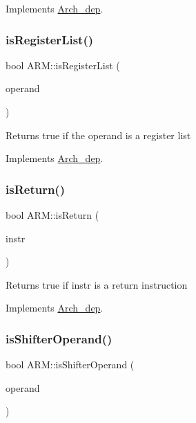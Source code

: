 Implements \hyperlink{classArch__dep_aa96008928838f1ff0f96ba83b07b90e2}{Arch\+\_\+dep}.

\mbox{\label{classARM_a62f252e1f0782243bc908a080ca1b427}} 
\subsubsection{\texorpdfstring{is\+Register\+List()}{isRegisterList()}}
{\footnotesize\ttfamily bool A\+R\+M\+::is\+Register\+List (\begin{DoxyParamCaption}\item[{const string \&}]{operand }\end{DoxyParamCaption})\hspace{0.3cm}{\ttfamily [virtual]}}

Returns true if the operand is a register list 

Implements \hyperlink{classArch__dep_a6c37096e67b2c02e9c0bd38313245979}{Arch\+\_\+dep}.

\mbox{\label{classARM_a341bfe78c32b16cd589cc9b4775e38fe}} 
\subsubsection{\texorpdfstring{is\+Return()}{isReturn()}}
{\footnotesize\ttfamily bool A\+R\+M\+::is\+Return (\begin{DoxyParamCaption}\item[{const \hyperlink{classObjdumpInstruction}{Objdump\+Instruction} \&}]{instr }\end{DoxyParamCaption})\hspace{0.3cm}{\ttfamily [virtual]}}

Returns true if instr is a return instruction 

Implements \hyperlink{classArch__dep_a0f8a68b8dc2188a0578f3b4d92a289ca}{Arch\+\_\+dep}.

\mbox{\label{classARM_a1dae5cec5d67a1ebb5cfaf4c0c5a0936}} 
\subsubsection{\texorpdfstring{is\+Shifter\+Operand()}{isShifterOperand()}}
{\footnotesize\ttfamily bool A\+R\+M\+::is\+Shifter\+Operand (\begin{DoxyParamCaption}\item[{const string \&}]{operand }\end{DoxyParamCaption})\hspace{0.3cm}{\ttfamily [virtual]}}


